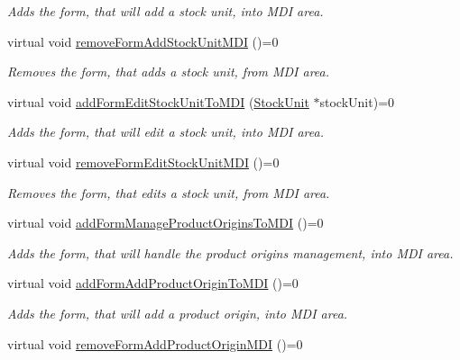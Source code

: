 \begin{DoxyCompactItemize}
\begin{DoxyCompactList}\small\item\em \-Adds the form, that will add a stock unit, into \-M\-D\-I area. \end{DoxyCompactList}\item 
virtual void \hyperlink{class_i_main_window_a2b31a0b0a7e630275cb6ca0d456d8acc}{remove\-Form\-Add\-Stock\-Unit\-M\-D\-I} ()=0
\begin{DoxyCompactList}\small\item\em \-Removes the form, that adds a stock unit, from \-M\-D\-I area. \end{DoxyCompactList}\item 
virtual void \hyperlink{class_i_main_window_a7095fce3cfae872391492251d37e7f28}{add\-Form\-Edit\-Stock\-Unit\-To\-M\-D\-I} (\hyperlink{class_stock_unit}{\-Stock\-Unit} $\ast$stock\-Unit)=0
\begin{DoxyCompactList}\small\item\em \-Adds the form, that will edit a stock unit, into \-M\-D\-I area. \end{DoxyCompactList}\item 
virtual void \hyperlink{class_i_main_window_aa27a508c59fe82d5024186827eb9a26a}{remove\-Form\-Edit\-Stock\-Unit\-M\-D\-I} ()=0
\begin{DoxyCompactList}\small\item\em \-Removes the form, that edits a stock unit, from \-M\-D\-I area. \end{DoxyCompactList}\item 
virtual void \hyperlink{class_i_main_window_ae7b73a3c35cd9f7bbcaeb4e46a39fbc4}{add\-Form\-Manage\-Product\-Origins\-To\-M\-D\-I} ()=0
\begin{DoxyCompactList}\small\item\em \-Adds the form, that will handle the product origins management, into \-M\-D\-I area. \end{DoxyCompactList}\item 
virtual void \hyperlink{class_i_main_window_ad737269109ec5d3038d0ba4d39cb76a8}{add\-Form\-Add\-Product\-Origin\-To\-M\-D\-I} ()=0
\begin{DoxyCompactList}\small\item\em \-Adds the form, that will add a product origin, into \-M\-D\-I area. \end{DoxyCompactList}\item 
virtual void \hyperlink{class_i_main_window_a3062fa79be6d9c6a443cf4d7b446af25}{remove\-Form\-Add\-Product\-Origin\-M\-D\-I} ()=0

\end{DoxyCompactItemize}
